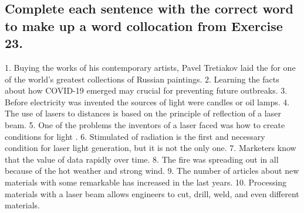 \subsection*{Complete each sentence with the correct word to make up a word collocation
      from Exercise 23.}
1. Buying the works of his contemporary artists, Pavel Tretiakov laid the \underline{\hspace{2cm}}
for one of the world’s greatest collections of Russian paintings. 2. Learning the facts
about how COVID-19 emerged may \underline{\hspace{2cm}} crucial for preventing future outbreaks. 3.
Before electricity was invented the \underline{\hspace{2cm}} sources of light were candles or oil
lamps. 4. The use of lasers to \underline{\hspace{2cm}} distances is based on the principle of
reflection of a laser beam. 5. One of the problems the inventors of a laser faced was
how to create conditions for light \underline{\hspace{2cm}}. 6. Stimulated \underline{\hspace{2cm}} of radiation
is the first and necessary condition for laser light generation, but it is not the only
one. 7. Marketers know that the value of data \underline{\hspace{2cm}} rapidly over time. 8. The
fire was spreading out in all \underline{\hspace{2cm}} because of the hot weather and strong wind. 9.
The number of articles about new materials with some remarkable \underline{\hspace{2cm}} has increased
in the last years. 10. Processing materials with a laser beam allows engineers to cut,
drill, weld, and even \underline{\hspace{2cm}} different materials.

